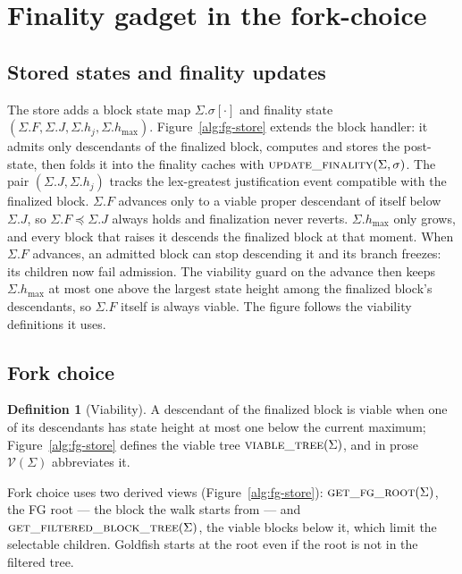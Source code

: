 \documentclass{article}
\theoremstyle{plain}
\theoremstyle{definition}
\newtheorem{definition}{Definition}
\theoremstyle{remark}
\newcommand{\viableTree}{\mathcal V}
\newcommand{\hmax}{h_{\max}}
\begin{document}
\section{Finality gadget in the fork-choice}\label{sec:fg-fork-choice}

\subsection{Stored states and finality updates}

The store adds a block state map $\Sigma.\sigma[\cdot]$ and finality state
$(\Sigma.F,\Sigma.J,\Sigma.h_j,\Sigma.\hmax)$.
Figure~\ref{alg:fg-store} extends the block handler: it admits only
descendants of the finalized block, computes and stores
the post-state, then folds it into the finality caches with
$\Call{update\_finality}{\Sigma,\sigma}$.  The pair
$(\Sigma.J,\Sigma.h_j)$ tracks the lex-greatest justification event
compatible with the finalized block.  $\Sigma.F$ advances
only to a viable proper descendant of itself below~$\Sigma.J$, so
$\Sigma.F\preceq\Sigma.J$ always holds and finalization never reverts.
$\Sigma.\hmax$ only grows, and every block that raises it descends the
finalized block at that moment.  When $\Sigma.F$ advances, an admitted
block can stop descending it and its branch freezes: its children now
fail admission.  The viability guard on the advance then keeps
$\Sigma.\hmax$ at most one above the largest state height among the
finalized block's descendants, so $\Sigma.F$ itself is always viable.
The figure follows the viability definitions it uses.

\subsection{Fork choice}

\begin{definition}[Viability]
\label{def:fg-candidate-tree}
A descendant of the finalized block is viable when one of its
descendants has state height at most one below the current maximum;
Figure~\ref{alg:fg-store} defines the viable tree
$\Call{viable\_tree}{\Sigma}$, and in prose $\viableTree(\Sigma)$
abbreviates it.
\end{definition}

Fork choice uses two derived views (Figure~\ref{alg:fg-store}):
$\Call{get\_fg\_root}{\Sigma}$, the FG root --- the block the walk
starts from --- and
$\Call{get\_filtered\_block\_tree}{\Sigma}$, the viable blocks below it,
which limit the selectable children.  Goldfish starts at the root even if
the root is not in the filtered tree.
\end{document}
